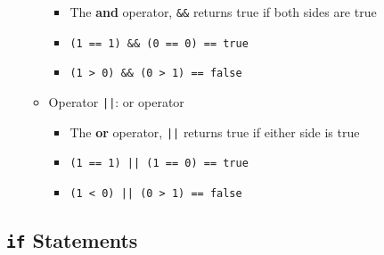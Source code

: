 \documentclass{article}
\begin{document}
\begin{itemize}
\begin{itemize}
		\begin{itemize}
			\item The \textbf{and} operator, \texttt{\&\&} returns true if both sides are true
			\item \texttt{(1 == 1) \&\& (0 == 0) == true}
			\item \texttt{(1 > 0) \&\& (0 > 1) == false}
		\end{itemize}
		\item Operator \texttt{||}: or operator
		\begin{itemize}
			\item The \textbf{or} operator, \texttt{||} returns true if either side is true
			\item \texttt{(1 == 1) || (1 == 0) == true}
			\item \texttt{(1 < 0) || (0 > 1) == false}
		\end{itemize}
	\end{itemize}
\end{itemize}

\subsection{\texttt{if} Statements}
\end{document}

